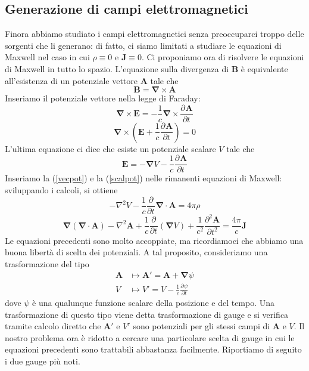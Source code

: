 \documentclass[a4paper,11pt]{book}
\newcommand{\der}[3][]{\frac{\partial ^{#1}#2}{\partial {#3}^{#1}}}
\let\oldnabla\nabla
\renewcommand{\nabla}{\vec{\oldnabla}}
\newcommand{\lap}{\oldnabla^2}
\renewcommand{\vec}[1]{\mathbf{#1}}
\theoremstyle{theorem}
\theoremstyle{definition}
\begin{document}
\subsection{Generazione di campi elettromagnetici}
Finora abbiamo studiato i campi elettromagnetici senza preoccuparci troppo delle sorgenti che li generano: di fatto, ci siamo limitati a studiare le equazioni di Maxwell nel caso in cui $\rho\equiv0$ e $\vec{J}\equiv0$. Ci proponiamo ora di risolvere le equazioni di Maxwell in tutto lo spazio. L'equazione sulla divergenza di $\vec{B}$ è equivalente all'esistenza di un potenziale vettore $\vec{A}$ tale che
\begin{equation}
\vec{B}=\nabla\times\vec{A}\label{vecpot}
\end{equation}
Inseriamo il potenziale vettore nella legge di Faraday:
\[\nabla\times\vec{E}=-\frac{1}{c}\nabla\times\der{\vec{A}}{t}\]
\[\nabla\times\left(\vec{E}+\frac{1}{c}\der{\vec{A}}{t}\right)=0\]
L'ultima equazione ci dice che esiste un potenziale scalare $V$ tale che
\begin{equation}\vec{E}=-\nabla V-\frac{1}{c}\der{\vec{A}}{t}\label{scalpot}\end{equation}
Inseriamo la (\ref{vecpot}) e la (\ref{scalpot}) nelle rimanenti equazioni di Maxwell: sviluppando i calcoli, si ottiene
\[-\lap V-\frac{1}{c}\der{}{t}\nabla\cdot\vec{A}=4\pi\rho\]
\[\nabla(\nabla\cdot\vec{A})-\lap\vec{A}+\frac{1}{c}\der{}{t}(\nabla V)+\frac{1}{c^2}\der[2]{\vec{A}}{t}=\frac{4\pi}{c}\vec{J}\]
Le equazioni precedenti sono molto accoppiate, ma ricordiamoci che abbiamo una buona libertà di scelta dei potenziali. A tal proposito, consideriamo una trasformazione del tipo
\begin{align*}
	\vec{A}&\mapsto\vec{A}'=\vec{A}+\nabla\psi\\
	V&\mapsto V'=V-\frac{1}{c}\der{\psi}{t}
\end{align*}
dove $\psi$ è una qualunque funzione scalare della posizione e del tempo. Una trasformazione di questo tipo viene detta trasformazione di gauge e si verifica tramite calcolo diretto che $\vec{A}'$ e $V'$ sono potenziali per gli stessi campi di $\vec{A}$ e $V$. Il nostro problema ora è ridotto a cercare una particolare scelta di gauge in cui le equazioni precedenti sono trattabili abbastanza facilmente. Riportiamo di seguito i due gauge più noti.
\end{document}
